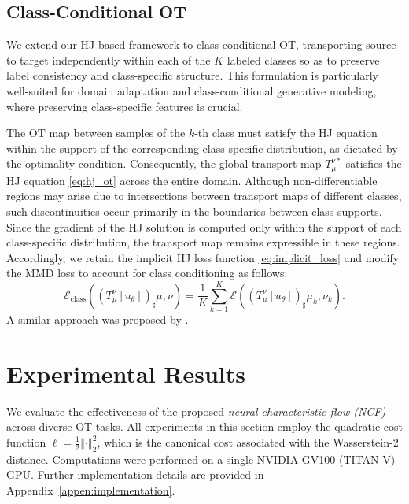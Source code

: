 \documentclass{article} %
\theoremstyle{plain}
\theoremstyle{definition}
\theoremstyle{remark}
\begin{document}
\vspace{-0.1cm}



\subsection{Class-Conditional OT}\vspace{-0.3em}
We extend our HJ-based framework to class-conditional OT, transporting source to target independently within each of the $K$ labeled classes so as to preserve label consistency and class-specific structure.
This formulation is particularly well-suited for domain adaptation and class-conditional generative modeling, where preserving class-specific features is crucial.

The OT map between samples of the $k$-th class must satisfy the HJ equation within the support of the corresponding class-specific distribution, as dictated by the optimality condition. Consequently, the global transport map $T^{\nu *}_{\mu}$ satisfies the HJ equation \eqref{eq:hj_ot} across the entire domain. Although non-differentiable regions may arise due to intersections between transport maps of different classes, such discontinuities occur primarily in the boundaries between class supports. Since the gradient of the HJ solution is computed only within the support of each class-specific distribution, the transport map remains expressible in these regions.
Accordingly, we retain the implicit HJ loss function \eqref{eq:implicit_loss} and modify the MMD loss to account for class conditioning as follows:
\vspace{-0.09cm}
\begin{equation}
\mathcal{E}_{\text{class}}(\left(T_\mu^\nu\left[u_\theta\right]\right)_\sharp\mu, \nu) = \frac{1}{K}\sum_{k=1}^K \mathcal{E}(\left(T_\mu^\nu\left[u_\theta\right]\right)_\sharp\mu_k, \nu_k).    
\end{equation}
\vspace{-0.05cm}
A similar approach was proposed by \cite{asadulaev2022neural}.


\section{Experimental Results}\label{sec:experiments}\vspace{-0.3em}
We evaluate the effectiveness of the proposed \textit{neural characteristic flow (NCF)} across diverse OT tasks.
All experiments in this section employ the quadratic cost function $\ell=\frac{1}{2}\left\Vert\cdot\right\Vert_2^2$, which is the canonical cost associated with the Wasserstein-2 distance.
Computations were performed on a single NVIDIA GV100 (TITAN V) GPU.
Further implementation details are provided in Appendix~\ref{appen:implementation}.
\end{document}
